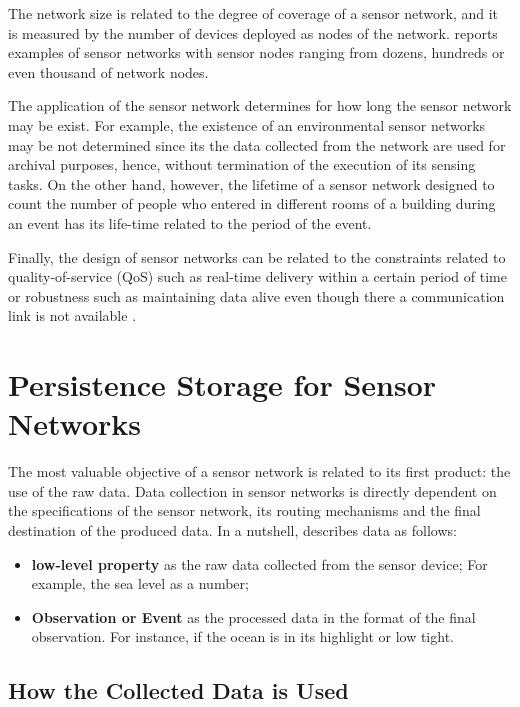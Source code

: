 The network size is related to the degree of coverage of a sensor network, and
it is measured by the number of devices deployed as nodes of the network.
\cite{sn-intro01} reports examples of sensor networks with sensor nodes ranging
from dozens, hundreds or even thousand of network nodes.

The application of the sensor network determines for how long the sensor network
may be exist. For example, the existence of an environmental sensor networks
\cite{sn-ex01} may be not determined since its the data collected from the
network are used for archival purposes, hence, without termination of the
execution of its sensing tasks. On the other hand, however, the lifetime of a
sensor network designed to count the number of people who entered in different
rooms of a building during an event has its life-time related to the period of
the event.

Finally, the design of sensor networks can be related to the constraints
related to quality-of-service (QoS) such as real-time delivery within a
certain period of time or robustness such as maintaining data alive even
though there a communication link is not available \cite{sn-intro02}.

\section{Persistence Storage for Sensor Networks}

The most valuable objective of a sensor network is related to its first
product: the use of the raw data. Data collection in sensor networks is
directly dependent on the specifications of the sensor network, its routing
mechanisms and the final destination of the produced data. In a nutshell,
\cite{sn-storage03} describes data as follows:

\begin{itemize}
  \item \textbf{low-level property} as the raw data collected from the sensor
  device; For example, the sea level as a number;
  \item \textbf{Observation or Event} as the processed data in the format of
  the final observation. For instance, if the ocean is in its highlight or low
  tight.
\end{itemize}

\subsection{How the Collected Data is Used}
\label{sec:sn-data-purpose}


